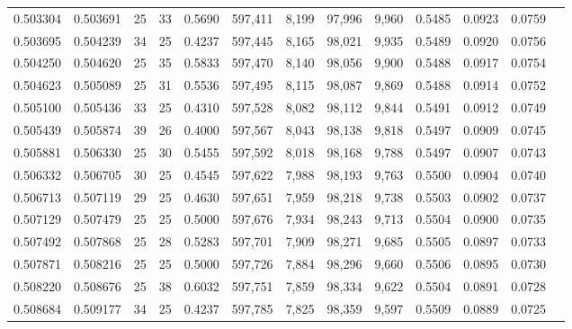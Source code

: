 \begin{tabular}{rrrrrrrrrrrrr}
0.503304 & 0.503691 &    25 &  33 &                                     0.5690 & 597,411 &   8,199 &  97,996 &   9,960 & 0.5485 & 0.0923 & 0.0759 \\
0.503695 & 0.504239 &    34 &  25 &                                     0.4237 & 597,445 &   8,165 &  98,021 &   9,935 & 0.5489 & 0.0920 & 0.0756 \\
0.504250 & 0.504620 &    25 &  35 &                                     0.5833 & 597,470 &   8,140 &  98,056 &   9,900 & 0.5488 & 0.0917 & 0.0754 \\
0.504623 & 0.505089 &    25 &  31 &                                     0.5536 & 597,495 &   8,115 &  98,087 &   9,869 & 0.5488 & 0.0914 & 0.0752 \\
0.505100 & 0.505436 &    33 &  25 &                                     0.4310 & 597,528 &   8,082 &  98,112 &   9,844 & 0.5491 & 0.0912 & 0.0749 \\
0.505439 & 0.505874 &    39 &  26 &                                     0.4000 & 597,567 &   8,043 &  98,138 &   9,818 & 0.5497 & 0.0909 & 0.0745 \\
0.505881 & 0.506330 &    25 &  30 &                                     0.5455 & 597,592 &   8,018 &  98,168 &   9,788 & 0.5497 & 0.0907 & 0.0743 \\
0.506332 & 0.506705 &    30 &  25 &                                     0.4545 & 597,622 &   7,988 &  98,193 &   9,763 & 0.5500 & 0.0904 & 0.0740 \\
0.506713 & 0.507119 &    29 &  25 &                                     0.4630 & 597,651 &   7,959 &  98,218 &   9,738 & 0.5503 & 0.0902 & 0.0737 \\
0.507129 & 0.507479 &    25 &  25 &                                     0.5000 & 597,676 &   7,934 &  98,243 &   9,713 & 0.5504 & 0.0900 & 0.0735 \\
0.507492 & 0.507868 &    25 &  28 &                                     0.5283 & 597,701 &   7,909 &  98,271 &   9,685 & 0.5505 & 0.0897 & 0.0733 \\
0.507871 & 0.508216 &    25 &  25 &                                     0.5000 & 597,726 &   7,884 &  98,296 &   9,660 & 0.5506 & 0.0895 & 0.0730 \\
0.508220 & 0.508676 &    25 &  38 &                                     0.6032 & 597,751 &   7,859 &  98,334 &   9,622 & 0.5504 & 0.0891 & 0.0728 \\
0.508684 & 0.509177 &    34 &  25 &                                     0.4237 & 597,785 &   7,825 &  98,359 &   9,597 & 0.5509 & 0.0889 & 0.0725 \\

\end{tabular}
